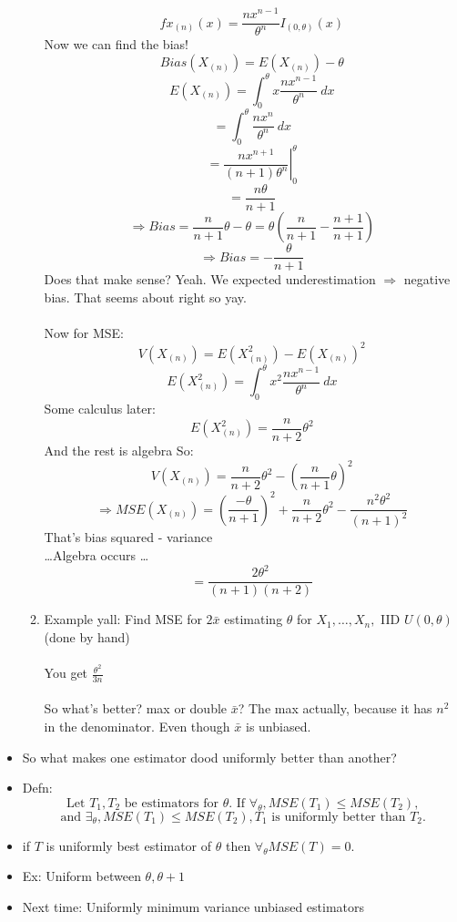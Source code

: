\documentclass{article}
\begin{document}
\begin{itemize}
\begin{enumerate}
          \[
            f{x_{(n)}}(x) = \frac{nx^{n - 1}}{\theta^n}I_{(0, \theta)}(x)
          \] 
          Now we can find the bias!
          \[
            Bias(X_{(n)}) = E(X_{(n)}) - \theta
          \]
          \[
            E(X_{(n)}) = \int_0^\theta x \frac{nx^{n-1}}{\theta^n}~dx
          \] 
          \[
            = \int_0^\theta \frac{nx^n}{\theta^n}~dx
          \] 
          \[
            = \left. \frac{nx^{n + 1}}{(n + 1)\theta^n} \right|_0^\theta
          \] 
          \[
            = \frac{n\theta}{n + 1}
          \] 
          \[
            \Rightarrow Bias = \frac{n}{n + 1} \theta - \theta = \theta \left( \frac{n}{n + 1} - \frac{n + 1}{n + 1}\right)
          \] 
          \[
            \Rightarrow Bias = -\frac{\theta}{n + 1}
          \]
          Does that make sense? Yeah. We expected underestimation $ \Rightarrow $ negative bias. That seems about right so yay. \\\\
          Now for MSE:
          \[
            V(X_{(n)}) = E\left(X_{(n)}^2\right) - E{\left(X_{(n)}\right)}^2
          \] 
          \[
            E(X_{(n)}^2) = \int_0^\theta x^2 \frac{nx^{n - 1}}{\theta^n}~dx
          \]
          Some calculus later:
          \[
            E(X_{(n)}^2) = \frac{n}{n + 2} \theta^2
          \] 
          And the rest is algebra
          So:
          \[
          V(X_{(n)}) = \frac{n}{n + 2} \theta^2 - {\left(\frac{n}{n + 1} \theta \right)}^2
          \] 
          \[
            \Rightarrow MSE(X_{(n)}) = \left( \frac{-\theta}{n + 1}\right)^2 + \frac{n}{n + 2} \theta^2 - \frac{n^2 \theta^2}{(n + 1)^2}
          \] 
          That's bias squared - variance \\
          \ldots Algebra occurs \ldots \\
          \[
            = \frac{2 \theta^2}{(n + 1) (n + 2)}
          \] 
        \item Example yall: Find MSE for $ 2 \bar{x} $ estimating $ \theta $ for  $ X_1, \ldots, X_n, $ IID $ U(0, \theta) $
          (done by hand)
          \\\\ You get $ \frac{\theta^2}{3n} $ \\\\
          So what's better? max or double $ \bar{x} $? The max actually, because it has $ n^2 $ in the denominator. Even though $ \bar{x} $ is unbiased.
      \end{enumerate}
    \item So what makes one estimator dood uniformly better than another?
    \item Defn:
      \[
        \text{ Let } T_1, T_2 \text{ be estimators for } \theta. \text{ If } \forall_\theta, MSE(T_1) \leq MSE(T_2), 
      \] 
      \[
        \text{ and } \exists_\theta, MSE(T_1) \leq MSE(T_2), T_1 \text{ is uniformly better than }T_2.
      \] 
    \item if $ T $ is uniformly best estimator of  $ \theta $ then  $ \forall_{\theta} MSE(T) = 0  $.
    \item Ex: Uniform between $ \theta, \theta + 1 $
    \item Next time: Uniformly minimum variance unbiased estimators
  \end{itemize}
\end{document}
